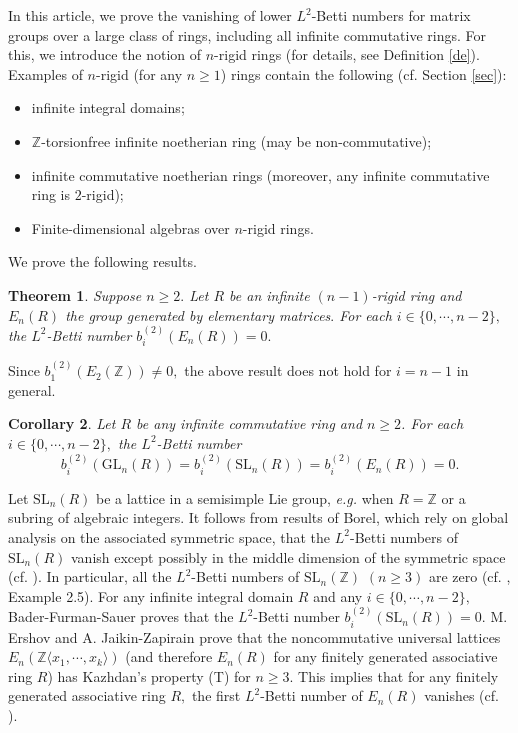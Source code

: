 \documentclass{gtpart}     %
\newtheorem{theorem}{Theorem}[section]
\newtheorem{corollary}[theorem]{Corollary}
\begin{document}
In this article, we prove the vanishing of lower $L^{2}$-Betti numbers for
matrix groups over a large class of rings, including all infinite
commutative rings. For this, we introduce the notion of $n$-rigid rings (for
details, see Definition \ref{de}). Examples of $n$-rigid (for any $n\geq 1$)
rings contain the following (cf. Section \ref{sec}):

\begin{itemize}
\item infinite integral domains;

\item $\mathbb{Z}$-torsionfree infinite noetherian ring (may be
non-commutative);

\item infinite commutative noetherian rings (moreover, any infinite
commutative ring is $2$-rigid);

\item Finite-dimensional algebras over $n$-rigid rings.
\end{itemize}

We prove the following results.

\begin{theorem}
\label{main}Suppose $n\geq 2.$ Let $R$ be an infinite $(n-1)$-rigid ring and
$E_{n}(R)$ the group generated by elementary matrices$.$ For each $i\in
\{0,\cdots ,n-2\},$ the $L^{2}$-Betti number $b_{i}^{(2)}(E_{n}(R))=0.$
\end{theorem}

Since $b_{1}^{(2)}(E_{2}(\mathbb{Z}))\neq 0,$ the above result does not hold
for $i=n-1$ in general.

\begin{corollary}
\label{cor}\bigskip Let $R$ be any infinite commutative ring and $n\geq 2$.
For each $i\in \{0,\cdots ,n-2\},$ the $L^{2}$-Betti number
\begin{equation*}
b_{i}^{(2)}(\mathrm{GL}_{n}(R))=b_{i}^{(2)}(\mathrm{SL}%
_{n}(R))=b_{i}^{(2)}(E_{n}(R))=0.
\end{equation*}
\end{corollary}

Let $\mathrm{SL}_{n}(R)$ be a lattice in a semisimple Lie group, \textsl{e.g.%
} when $R=\mathbb{Z}$ or a subring of algebraic integers. It follows from
results of Borel, which rely on global analysis on the associated symmetric
space, that the $L^{2}$-Betti numbers of $\mathrm{SL}_{n}(R)$ vanish except
possibly in the middle dimension of the symmetric space (cf. \cite{Bo,O}).
In particular, all the $L^{2}$-Betti numbers of $\mathrm{SL}_{n}(\mathbb{Z})$
$(n\geq 3)$ are zero (cf. \cite{Ec}, Example 2.5). For any infinite integral
domain $R$ and any $i\in \{0,\cdots ,n-2\},$ Bader-Furman-Sauer \cite{bf}
proves that the $L^{2}$-Betti number $b_{i}^{(2)}(\mathrm{SL}_{n}(R))=0.$ M.
Ershov and A. Jaikin-Zapirain \cite{ej} prove that the noncommutative
universal lattices $E_{n}(\mathbb{Z}\langle x_{1},\cdots ,x_{k}\rangle )$
(and therefore $E_{n}(R)$ for any finitely generated associative ring $R$)
has Kazhdan's property (\textrm{T}) for $n\geq 3.$ This implies that for any
finitely generated associative ring $R,$ the first $L^{2}$-Betti number of $%
E_{n}(R)$ vanishes (cf. \cite{bv}).
\end{document}
